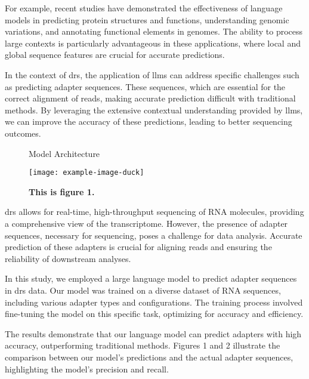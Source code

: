 \documentclass[pdflatex, sn-mathphys-num, lineno]{sn-jnl}%
\theoremstyle{thmstyleone}%
\theoremstyle{thmstyletwo}%
\theoremstyle{thmstylethree}%
\begin{document}
For example, recent studies have demonstrated the effectiveness of language models in predicting protein structures and functions, understanding genomic variations, and annotating functional elements in genomes.
The ability to process large contexts is particularly advantageous in these applications, where local and global sequence features are crucial for accurate predictions.

In the context of \gls{drs}, the application of \glspl{llm} can address specific challenges such as predicting adapter sequences.
These sequences, which are essential for the correct alignment of reads, making accurate prediction difficult with traditional methods.
By leveraging the extensive contextual understanding provided by \glspl{llm}, we can improve the accuracy of these predictions, leading to better sequencing outcomes.

\begin{figure}
	\begin{center}
		
	\end{center}
	\caption{Model Architecture}\label{fig:model}
\end{figure}

\begin{figure}[!h]
	\texttt{[image: example-image-duck]}
	\caption{\bf This is figure 1.}
	\label{fig:f1}
\end{figure}


\gls{drs} allows for real-time, high-throughput sequencing of RNA molecules, providing a comprehensive view of the transcriptome.
However, the presence of adapter sequences, necessary for sequencing, poses a challenge for data analysis.
Accurate prediction of these adapters is crucial for aligning reads and ensuring the reliability of downstream analyses.

In this study, we employed a large language model to predict adapter sequences in \gls{drs} data.
Our model was trained on a diverse dataset of RNA sequences, including various adapter types and configurations.
The training process involved fine-tuning the model on this specific task, optimizing for accuracy and efficiency.

The results demonstrate that our language model can predict adapters with high accuracy, outperforming traditional methods.
Figures 1 and 2 illustrate the comparison between our model's predictions and the actual adapter sequences, highlighting the model's precision and recall.
\end{document}
